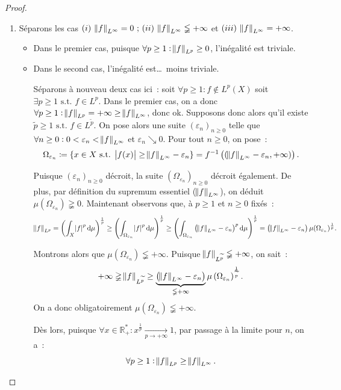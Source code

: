 \documentclass{article}
\newcommand{\pinfty}{{+\infty}}
\newcommand{\st}{\text{ s.t. }}
\newcommand{\R}{{\mathbb R}}
\begin{document}
\begin{proof}~
\begin{enumerate}
	\item Séparons les cas $(i)~\norm f_{L^\infty} = 0~; \, (ii)~\norm f_{L^\infty} \lneqq \pinfty$ et $(iii)~\norm f_{L^\infty} = \pinfty$.
	\begin{itemize}
		\item Dans le premier cas, puisque $\forall p \geq 1 : \norm f_{L^p} \geq 0$, l'inégalité est triviale.
		\item Dans le second cas, l'inégalité est\ldots~moins triviale.

		Séparons à nouveau deux cas ici~: soit $\forall p \geq 1 : f \not \in L^p(X)$ soit $\exists p \geq 1 \st f \in L^p$. Dans le premier cas, on a donc
		$\forall p \geq 1 : \norm f_{L^p} = \pinfty \geq \norm f_{L^\infty}$, donc ok. Supposons donc alors qu'il existe $\widetilde p \geq 1 \st f \in L^{\widetilde p}$.
		On pose alors une suite $(\varepsilon_n)_{n \geq 0}$ telle que $\forall n \geq 0 : 0 < \varepsilon_n < \norm f_{L^\infty}$ et $\varepsilon_n \searrow 0$.
		Pour tout $n \geq 0$, on pose~:
		\[\Omega_{\varepsilon_n} \coloneqq \{x \in X \st \abs {f(x)} \geq \norm f_{L^\infty}-\varepsilon_n\} = f^{-1}\left((\norm f_{L^\infty}-\varepsilon_n, \pinfty)\right).\]

		Puisque $(\varepsilon_n)_{n \geq 0}$ décroit, la suite $(\Omega_{\varepsilon_n})_{n \geq 0}$ décroit également. De plus, par définition du supremum essentiel ($\norm f_{L^\infty}$),
		on déduit $\mu(\Omega_{\varepsilon_n}) \gneqq 0$. Maintenant observons que, à $p \geq 1$ et $n \geq 0$ fixés~:
		\[\norm f_{L^p} = \left(\int_X\abs f^p\dif\mu\right)^{\frac 1p} \geq \left(\int_{\Omega_{\varepsilon_n}}\abs f^p\dif\mu\right)^{\frac 1p}
		\geq \left(\int_{\Omega_{\varepsilon_n}}\left(\norm f_{L^\infty}-\varepsilon_n\right)^p\dif\mu\right)^\frac 1p
		= \left(\norm f_{L^\infty}-\varepsilon_n\right)\mu(\Omega_{\varepsilon_n})^{\frac 1p}.\]

		Montrons alors que $\mu(\Omega_{\varepsilon_n}) \lneqq \pinfty$. Puisque $\norm f_{L^{\widetilde p}} \lneqq \pinfty$, on sait~:
		\[\pinfty \gneqq \norm f_{L^{\widetilde p}} \geq \underbrace {\left(\norm f_{L^\infty}-\varepsilon_n\right)}_{\lneqq \pinfty}\mu\left(\Omega_{\varepsilon_n}\right)^{\frac 1{\widetilde p}}.\]
		On a donc obligatoirement $\mu(\Omega_{\varepsilon_n}) \lneqq \pinfty$.

		Dès lors, puisque $\forall x \in \R_+^* : x^{\frac 1p} \xrightarrow[p \to \pinfty]{} 1$, par passage à la limite pour $n$, on a~:
		\[\forall p \geq 1 : \norm f_{L^p} \geq \norm f_{L^\infty}.\]


\end{itemize}
\end{enumerate}
\end{proof}
\end{document}
